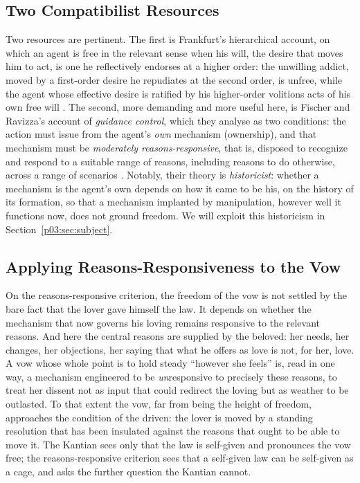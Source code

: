 \subsection{Two Compatibilist Resources}

Two resources are pertinent. The first is Frankfurt's hierarchical account, on which an agent is free in the relevant sense when his will, the desire that moves him to act, is one he reflectively endorses at a higher order: the unwilling addict, moved by a first-order desire he repudiates at the second order, is unfree, while the agent whose effective desire is ratified by his higher-order volitions acts of his own free will \parencite{frankfurt1971freedom}. The second, more demanding and more useful here, is Fischer and Ravizza's account of \emph{guidance control}, which they analyse as two conditions: the action must issue from the agent's \emph{own} mechanism (ownership), and that mechanism must be \emph{moderately reasons-responsive}, that is, disposed to recognize and respond to a suitable range of reasons, including reasons to do otherwise, across a range of scenarios \parencite{fischer1998responsibility}. Notably, their theory is \emph{historicist}: whether a mechanism is the agent's own depends on how it came to be his, on the history of its formation, so that a mechanism implanted by manipulation, however well it functions now, does not ground freedom. We will exploit this historicism in Section~\ref{p03:sec:subject}.

\subsection{Applying Reasons-Responsiveness to the Vow}

On the reasons-responsive criterion, the freedom of the vow is not settled by the bare fact that the lover gave himself the law. It depends on whether the mechanism that now governs his loving remains responsive to the relevant reasons. And here the central reasons are supplied by the beloved: her needs, her changes, her objections, her saying that what he offers as love is not, for her, love. A vow whose whole point is to hold steady ``however she feels'' is, read in one way, a mechanism engineered to be \emph{un}responsive to precisely these reasons, to treat her dissent not as input that could redirect the loving but as weather to be outlasted. To that extent the vow, far from being the height of freedom, approaches the condition of the driven: the lover is moved by a standing resolution that has been insulated against the reasons that ought to be able to move it. The Kantian sees only that the law is self-given and pronounces the vow free; the reasons-responsive criterion sees that a self-given law can be self-given as a cage, and asks the further question the Kantian cannot.

